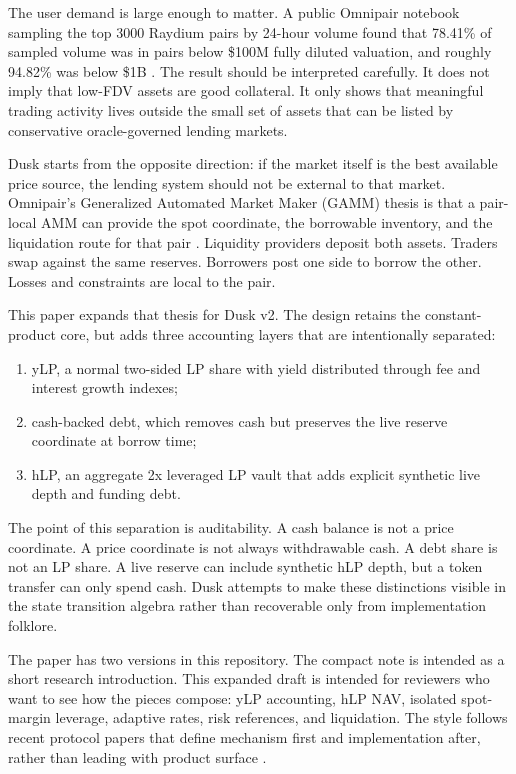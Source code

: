 \documentclass[11pt]{article}
\begin{document}
The user demand is large enough to matter. A public Omnipair notebook sampling the top 3000 Raydium pairs by 24-hour volume found that 78.41\% of sampled volume was in pairs below \$100M fully diluted valuation, and roughly 94.82\% was below \$1B \cite{omnipair-raydium-notebook}. The result should be interpreted carefully. It does not imply that low-FDV assets are good collateral. It only shows that meaningful trading activity lives outside the small set of assets that can be listed by conservative oracle-governed lending markets.

Dusk starts from the opposite direction: if the market itself is the best available price source, the lending system should not be external to that market. Omnipair's Generalized Automated Market Maker (GAMM) thesis is that a pair-local AMM can provide the spot coordinate, the borrowable inventory, and the liquidation route for that pair \cite{omnipair-docs-intro,omnipair-docs-gamm}. Liquidity providers deposit both assets. Traders swap against the same reserves. Borrowers post one side to borrow the other. Losses and constraints are local to the pair.

This paper expands that thesis for Dusk v2. The design retains the constant-product core, but adds three accounting layers that are intentionally separated:
\begin{enumerate}
  \item yLP, a normal two-sided LP share with yield distributed through fee and interest growth indexes;
  \item cash-backed debt, which removes cash but preserves the live reserve coordinate at borrow time;
  \item hLP, an aggregate 2x leveraged LP vault that adds explicit synthetic live depth and funding debt.
\end{enumerate}

The point of this separation is auditability. A cash balance is not a price coordinate. A price coordinate is not always withdrawable cash. A debt share is not an LP share. A live reserve can include synthetic hLP depth, but a token transfer can only spend cash. Dusk attempts to make these distinctions visible in the state transition algebra rather than recoverable only from implementation folklore.

The paper has two versions in this repository. The compact note is intended as a short research introduction. This expanded draft is intended for reviewers who want to see how the pieces compose: yLP accounting, hLP NAV, isolated spot-margin leverage, adaptive rates, risk references, and liquidation. The style follows recent protocol papers that define mechanism first and implementation after, rather than leading with product surface \cite{morpho-midnight}.
\end{document}
